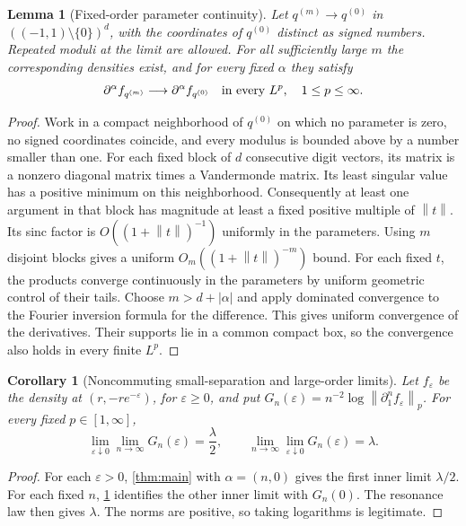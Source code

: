\documentclass[11pt,a4paper]{article}
\numberwithin{equation}{section}
\newtheorem{lemma}[theorem]{Lemma}
\newtheorem{corollary}[theorem]{Corollary}
\theoremstyle{definition}
\theoremstyle{remark}\newtheorem{remark}[theorem]{Remark}
\newcommand{\norm}[1]{\left\lVert #1\right\rVert}
\begin{document}
\begin{lemma}[Fixed-order parameter continuity]
\label{lem:paramcontinuity}
Let $q^{(m)}\to q^{(0)}$ in $((-1,1)\setminus\{0\})^d$, with the coordinates
of $q^{(0)}$ distinct as signed numbers. Repeated moduli at the limit are
allowed. For all sufficiently large $m$ the corresponding densities exist,
and for every fixed $\alpha$ they satisfy
\begin{equation}
 \partial^\alpha f_{q^{(m)}}\longrightarrow
 \partial^\alpha f_{q^{(0)}}\quad\hbox{in every }L^p,\quad1\le p\le\infty.
 \label{eq:paramcontinuity}
\end{equation}
\end{lemma}
\begin{proof}
Work in a compact neighborhood of $q^{(0)}$ on which no parameter is zero,
no signed coordinates coincide, and every modulus is bounded above by a
number smaller than one. For each fixed block of $d$ consecutive digit
vectors, its matrix is a nonzero diagonal matrix times a Vandermonde matrix.
Its least singular value has a positive minimum on this neighborhood.
Consequently at least one argument in that block has magnitude at least a
fixed positive multiple of $\norm t$. Its sinc factor is
$O((1+\norm t)^{-1})$ uniformly in the parameters.
Using $m$ disjoint blocks gives a uniform $O_m((1+\norm t)^{-m})$ bound.
For each fixed $t$, the products converge continuously in the parameters by
uniform geometric control of their tails. Choose $m>d+|\alpha|$ and apply
dominated convergence to the Fourier inversion formula for the difference.
This gives uniform convergence of the derivatives. Their supports lie in a
common compact box, so the convergence also holds in every finite $L^p$.
\end{proof}

\begin{corollary}[Noncommuting small-separation and large-order limits]
\label{cor:noncommute}
Let $f_\varepsilon$ be the density at $(r,-re^{-\varepsilon})$, for
$\varepsilon\ge0$, and put
$G_n(\varepsilon)=n^{-2}\log\norm{\partial_1^nf_\varepsilon}_p$.
For every fixed $p\in[1,\infty]$,
\begin{equation}
 \boxed{
 \lim_{\varepsilon\downarrow0}\lim_{n\to\infty}G_n(\varepsilon)=\frac\lambda2,
 \qquad
 \lim_{n\to\infty}\lim_{\varepsilon\downarrow0}G_n(\varepsilon)=\lambda.}
 \label{eq:noncommute}
\end{equation}
\end{corollary}
\begin{proof}
For each $\varepsilon>0$, \cref{thm:main} with $\alpha=(n,0)$ gives the first
inner limit $\lambda/2$. For each fixed $n$, \cref{lem:paramcontinuity}
identifies the other inner limit with $G_n(0)$. The resonance law then gives
$\lambda$. The norms are positive, so taking logarithms is legitimate.
\end{proof}
\end{document}
